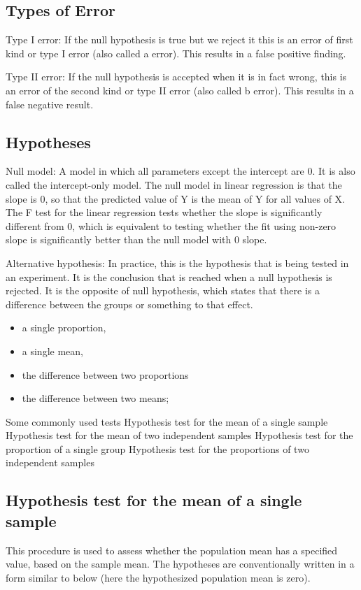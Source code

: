 
\subsection{Types of Error}
Type I error: If the null hypothesis is true but we reject it this is an error of first kind or type I error (also called a error). This results in a false positive finding.

Type II error: If the null hypothesis is accepted when it is in fact wrong, this is an error of the second kind or type II error (also called b error). This results in a false negative result.

\subsection{Hypotheses}

Null model: A model in which all parameters except the intercept are 0. It is also called the intercept-only model. The null model in linear regression is that the slope is 0, so that the predicted value of Y is the mean of Y for all values of X. The F test for the linear regression tests whether the slope is significantly different from 0, which is equivalent to testing whether the fit using non-zero slope is significantly better than the null model with 0 slope.

Alternative hypothesis: In practice, this is the hypothesis that is being tested in an experiment. It is the conclusion that is reached when a null hypothesis is rejected. It is the opposite of null hypothesis, which states that there is a difference between the groups or something to that effect.


\begin{itemize}
\item a single proportion,
\item a single mean,
\item the difference between two proportions	
\item the difference between two means;
\end{itemize}

Some commonly used tests
   Hypothesis test for the mean of a single sample
   Hypothesis test for the mean of two independent samples
   Hypothesis test for the proportion of a single group
   Hypothesis test for the proportions of two independent samples


\subsection{Hypothesis test for the mean of a single sample}
This procedure is used to assess whether the population mean  has a specified value, based on the sample mean. The hypotheses are conventionally written in a form similar to below (here the hypothesized population mean is zero).


